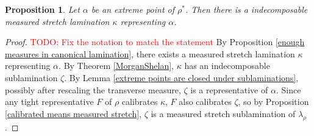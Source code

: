 \documentclass[reqno,11pt]{amsart}
\newcommand*\dif{\mathop{}\!\mathrm{d}}
\newcommand{\weakto}{\rightharpoonup}
\newcommand{\vol}{\mathrm{vol}}
\newcommand{\Mass}{\mathbf M}
\newtheorem{proposition}[theorem]{Proposition}
\theoremstyle{definition}
\numberwithin{equation}{section}
\newcommand\todo[1]{\textcolor{red}{TODO: #1}}
\begin{document}
\begin{proposition}\label{extreme points are indecomposable}
Let $\alpha$ be an extreme point of $\rho^*$.
Then there is a indecomposable measured stretch lamination $\kappa$ representing $\alpha$.
\end{proposition}
\begin{proof}
\todo{Fix the notation to match the statement} By Proposition \ref{enough measures in canonical lamination}, there exists a measured stretch lamination $\kappa$ representing $\alpha$.
By Theorem \ref{MorganShelan}, $\kappa$ has an indecomposable sublamination $\zeta$.
By Lemma \ref{extreme points are closed under sublaminations}, possibly after rescaling the transverse measure, $\zeta$ is a representative of $\alpha$.
Since any tight representative $F$ of $\rho$ calibrates $\kappa$, $F$ also calibrates $\zeta$, so by Proposition \ref{calibrated means measured stretch}, $\zeta$ is a measured stretch sublamination of $\lambda_\rho$.
\end{proof}




\end{document}
